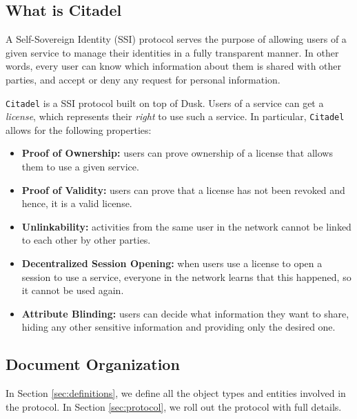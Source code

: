 
\subsection{What is Citadel} 

A Self-Sovereign Identity (SSI) protocol serves the purpose of allowing users of a given service to manage their identities in a fully transparent manner. In other words, every user can know which information about them is shared with other parties, and accept or deny any request for personal information.

\verb!Citadel! is a SSI protocol built on top of Dusk. Users of a service can get a \textit{license}, which represents their \textit{right} to use such a service. In particular, \verb!Citadel! allows for the following properties:

\begin{itemize}
	\item \textbf{Proof of Ownership:} users can prove ownership of a license that allows them to use a given service.
	\item \textbf{Proof of Validity:} users can prove that a license has not been revoked and hence, it is a valid license.
 	\item \textbf{Unlinkability:} activities from the same user in the network cannot be linked to each other by other parties.
 	\item \textbf{Decentralized Session Opening:} when users use a license to open a session to use a service, everyone in the network learns that this happened, so it cannot be used again.
	\item \textbf{Attribute Blinding:} users can decide what information they want to share, hiding any other sensitive information and providing only the desired one.
\end{itemize}

\subsection{Document Organization} 

In Section \ref{sec:definitions}, we define all the object types and entities involved in the protocol. In Section \ref{sec:protocol}, we roll out the protocol with full details.